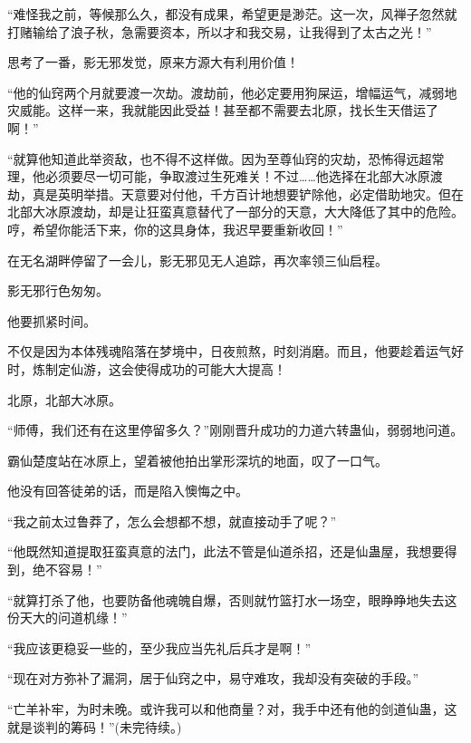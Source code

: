 \begin{this_body}
“难怪我之前，等候那么久，都没有成果，希望更是渺茫。这一次，风禅子忽然就打赌输给了浪子秋，急需要资本，所以才和我交易，让我得到了太古之光！”

思考了一番，影无邪发觉，原来方源大有利用价值！

“他的仙窍两个月就要渡一次劫。渡劫前，他必定要用狗屎运，增幅运气，减弱地灾威能。这样一来，我就能因此受益！甚至都不需要去北原，找长生天借运了啊！”

“就算他知道此举资敌，也不得不这样做。因为至尊仙窍的灾劫，恐怖得远超常理，他必须要尽一切可能，争取渡过生死难关！不过……他选择在北部大冰原渡劫，真是英明举措。天意要对付他，千方百计地想要铲除他，必定借助地灾。但在北部大冰原渡劫，却是让狂蛮真意替代了一部分的天意，大大降低了其中的危险。哼，希望你能活下来，你的这具身体，我迟早要重新收回！”

在无名湖畔停留了一会儿，影无邪见无人追踪，再次率领三仙启程。

影无邪行色匆匆。

他要抓紧时间。

不仅是因为本体残魂陷落在梦境中，日夜煎熬，时刻消磨。而且，他要趁着运气好时，炼制定仙游，这会使得成功的可能大大提高！

北原，北部大冰原。

“师傅，我们还有在这里停留多久？”刚刚晋升成功的力道六转蛊仙，弱弱地问道。

霸仙楚度站在冰原上，望着被他拍出掌形深坑的地面，叹了一口气。

他没有回答徒弟的话，而是陷入懊悔之中。

“我之前太过鲁莽了，怎么会想都不想，就直接动手了呢？”

“他既然知道提取狂蛮真意的法门，此法不管是仙道杀招，还是仙蛊屋，我想要得到，绝不容易！”

“就算打杀了他，也要防备他魂魄自爆，否则就竹篮打水一场空，眼睁睁地失去这份天大的问道机缘！”

“我应该更稳妥一些的，至少我应当先礼后兵才是啊！”

“现在对方弥补了漏洞，居于仙窍之中，易守难攻，我却没有突破的手段。”

“亡羊补牢，为时未晚。或许我可以和他商量？对，我手中还有他的剑道仙蛊，这就是谈判的筹码！”(未完待续。)

\end{this_body}

